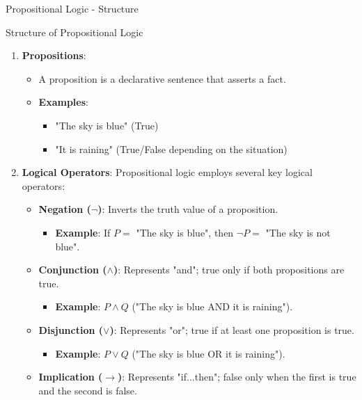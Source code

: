 \documentclass[aspectratio=169]{beamer}
\begin{document}
\begin{frame}[fragile]{Propositional Logic - Structure}
    \begin{block}{Structure of Propositional Logic}
        \begin{enumerate}
            \item \textbf{Propositions}:
            \begin{itemize}
                \item A proposition is a declarative sentence that asserts a fact. 
                \item \textbf{Examples}:
                \begin{itemize}
                    \item "The sky is blue" (True)
                    \item "It is raining" (True/False depending on the situation)
                \end{itemize}
            \end{itemize}
            \item \textbf{Logical Operators}:
            Propositional logic employs several key logical operators:
            \begin{itemize}
                \item \textbf{Negation ($\neg$)}: Inverts the truth value of a proposition.
                \begin{itemize}
                    \item \textbf{Example}: If $P = $ "The sky is blue", then $\neg P = $ "The sky is not blue".
                \end{itemize}
                \item \textbf{Conjunction ($\land$)}: Represents "and"; true only if both propositions are true.
                \begin{itemize}
                    \item \textbf{Example}: $P \land Q$ ("The sky is blue AND it is raining").
                \end{itemize}
                \item \textbf{Disjunction ($\lor$)}: Represents "or"; true if at least one proposition is true.
                \begin{itemize}
                    \item \textbf{Example}: $P \lor Q$ ("The sky is blue OR it is raining").
                \end{itemize}
                \item \textbf{Implication ($\rightarrow$)}: Represents "if...then"; false only when the first is true and the second is false.

\end{itemize}
\end{enumerate}
\end{block}
\end{frame}
\end{document}
